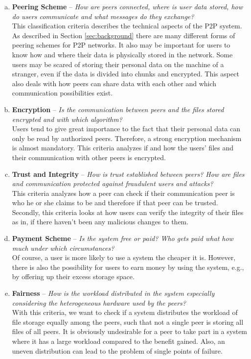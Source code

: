\begin{enumerate}[(a)]
\item \textbf{Peering Scheme} -- \textit{How are peers connected, where is user data stored, how do users communicate and what messages do they exchange?}\\
This classification criteria describes the technical aspects of the P2P system. As described in Section \ref{sec:background} there are many different forms of peering schemes for P2P networks. It also may be important for users to know how and where their data is physically stored in the network. Some users may be scared of storing their personal data on the machine of a stranger, even if the data is divided into chunks and encrypted. This aspect also deals with how peers can share data with each other and which communication possibilities exist. 

\item \textbf{Encryption} -- \textit{Is the communication between peers and the files stored encrypted and with which algorithm?}\\
Users tend to give great importance to the fact that their personal data can only be read by authorized peers. Therefore, a strong encryption mechanism is almost mandatory. This criteria analyzes if and how the users' files and their communication with other peers is encrypted.

\item \textbf{Trust and Integrity} -- \textit{How is trust established between peers? How are files and communication protected against fraudulent users and attacks?}\\
This criteria analyzes how a peer can check if their communication peer is who he or she claims to be and therefore if that peer can be trusted. Secondly, this criteria looks at how users can verify the integrity of their files as in, if there haven't been any malicious changes to them.

\item \textbf{Payment Scheme} -- \textit{Is the system free or paid? Who gets paid what how much under which circumstances?}\\
Of course, a user is more likely to use a system the cheaper it is. However, there is also the possibility for users to earn money by using the system, e.g., by offering up their excess storage space.

\item \textbf{Fairness} -- \textit{How is the workload distributed in the system especially considering the heterogeneous hardware used by the peers?}\\
With this criteria, we want to check if a system distributes the workload of file storage equally among the peers, such that not a single peer is storing all files of all peers. It is obviously undesirable for a peer to take part in a system where it has a large workload compared to the benefit gained. Also, an uneven distribution can lead to the problem of single points of failure.


\end{enumerate}
